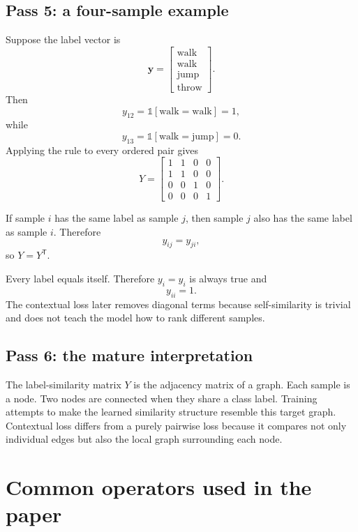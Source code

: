 \documentclass[11pt,oneside,openany]{book}
\theoremstyle{myplain}
\theoremstyle{definition}
\newcommand{\ind}{\mathds{1}}
\begin{document}
\subsection{Pass 5: a four-sample example}

Suppose the label vector is
\[
  \bm y=
  \begin{bmatrix}
  \text{walk}\\
  \text{walk}\\
  \text{jump}\\
  \text{throw}
  \end{bmatrix}.
\]
Then
\[
  y_{12}=\ind[\text{walk}=\text{walk}]=1,
\]
while
\[
  y_{13}=\ind[\text{walk}=\text{jump}]=0.
\]
Applying the rule to every ordered pair gives
\[
Y=
\begin{bmatrix}
1&1&0&0\\
1&1&0&0\\
0&0&1&0\\
0&0&0&1
\end{bmatrix}.
\]

\begin{conceptbox}[title=Why the matrix is symmetric]
If sample $i$ has the same label as sample $j$, then sample $j$ also has the same label as sample $i$. Therefore
\[
y_{ij}=y_{ji},
\]
so $Y=Y^{\mathsf T}$.
\end{conceptbox}

\begin{conceptbox}[title=Why the diagonal is one]
Every label equals itself. Therefore $y_i=y_i$ is always true and
\[
y_{ii}=1.
\]
The contextual loss later removes diagonal terms because self-similarity is trivial and does not teach the model how to rank different samples.
\end{conceptbox}

\subsection{Pass 6: the mature interpretation}

The label-similarity matrix $Y$ is the adjacency matrix of a graph. Each sample is a node. Two nodes are connected when they share a class label. Training attempts to make the learned similarity structure resemble this target graph. Contextual loss differs from a purely pairwise loss because it compares not only individual edges but also the local graph surrounding each node.

\section{Common operators used in the paper}
\end{document}
